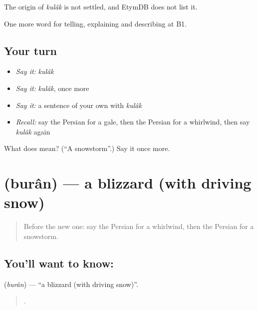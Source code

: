 \begin{cousinweb}
The origin of \emph{kulâk} is not settled, and EtymDB does not list it.
\end{cousinweb}

\begin{grammarlens}[title={What you've built}]
One more word for telling, explaining and describing at B1.
\end{grammarlens}

\subsection*{Your turn}
\begin{itemize}
\raggedright
  \item \emph{Say it:} \emph{kulâk}
  \item \emph{Say it:} \emph{kulâk}, once more
  \item \emph{Say it:} a sentence of your own with \emph{kulâk}
  \item \emph{Recall:} say the Persian for a gale, then the Persian for a whirlwind, then say \emph{kulâk} again
\end{itemize}

\begin{tcolorbox}[breakable,colback=teal!4,colframe=teal!35!black,title={Before you move on}]
What does  mean? (\textquotedblleft{}A snowstorm\textquotedblright{}.) Say it once more.
\end{tcolorbox}
\section[\texorpdfstring{\fa{بوران} (burân)}{بوران (burân)}]{ (burân) — a blizzard (with driving snow)}

\label{lesson:FA-C476-buran}



\begin{quote}
Before the new one: say the Persian for a whirlwind, then the Persian for a snowstorm.
\end{quote}

\subsection*{You'll want to know: }
\textbf{} (\emph{burân}) — \textquotedblleft{}a blizzard (with driving snow)\textquotedblright{}.

\begin{quote}
      .
\end{quote}

